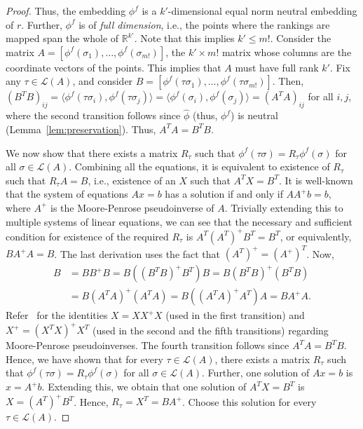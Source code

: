 \documentclass[prodmode,acmec]{ec-acmsmall}
\newcommand{\calL}{{\mathcal{L}}}
\newcommand{\rank}{{\calL(A)}}
\begin{document}
\begin{proof}
Thus, the embedding $\phi^f$ is a $k'$-dimensional equal norm neutral embedding of $r$. Further, $\phi^f$ is of \emph{full dimension}, i.e., the points where the rankings are mapped span the whole of $\mathbb{R}^{k'}$. Note that this implies $k' \le m!$. Consider the matrix $A = [\phi^f(\sigma_1), \ldots, \phi^f(\sigma_{m!})]$, the $k' \times m!$ matrix whose columns are the coordinate vectors of the points. This implies that $A$ must have full rank $k'$. Fix any $\tau \in \rank$, and consider $B = [\phi^f(\tau \sigma_1), \ldots, \phi^f(\tau \sigma_{m!})]$. Then, $(B^T B)_{ij} = \langle \phi^f(\tau \sigma_i), \phi^f(\tau \sigma_j) \rangle = \langle \phi^f(\sigma_i), \phi^f(\sigma_j) \rangle = (A^T A)_{ij}$ for all $i,j$, where the second transition follows since $\hat{\phi}$ (thus, $\phi^f$) is neutral (Lemma~\ref{lem:preservation}). Thus, $A^T A = B^T B$.

We now show that there exists a matrix $R_{\tau}$ such that $\phi^f(\tau \sigma) = R_{\tau} \phi^f(\sigma)$ for all $\sigma \in \rank$. Combining all the equations, it is equivalent to existence of $R_{\tau}$ such that $R_{\tau} A = B$, i.e., existence of an $X$ such that $A^T X = B^T$. It is well-known that the system of equations $Ax=b$ has a solution if and only if $AA^{+}b = b$, where $A^{+}$ is the Moore-Penrose pseudoinverse of $A$. Trivially extending this to multiple systems of linear equations, we can see that the necessary and sufficient condition for existence of the required $R_{\tau}$ is $A^T (A^T)^{+} B^T = B^T$, or equivalently, $B A^{+} A = B$. The last derivation uses the fact that $(A^T)^{+} = (A^{+})^T$. Now, 
\begin{align*}
B &= B B^{+} B = B \left( (B^T B)^{+} B^T \right) B = B (B^T B)^{+} \left( B^T B \right) \\
&= B (A^T A)^{+} \left( A^T A \right) = B \left( (A^T A)^{+} A^T \right) A = B A^{+} A.
\end{align*}
Refer~\cite{BH12} for the identities $X = X X^{+} X$ (used in the first transition) and $X^{+} = (X^T X)^{+} X^T$ (used in the second and the fifth transitions) regarding Moore-Penrose pseudoinverses. The fourth transition follows since $A^T A = B^T B$. Hence, we have shown that for every $\tau \in \rank$, there exists a matrix $R_{\tau}$ such that $\phi^f(\tau \sigma) = R_{\tau} \phi^f(\sigma)$ for all $\sigma \in \rank$. Further, one solution of $Ax=b$ is $x = A^{+}b$. Extending this, we obtain that one solution of $A^T X = B^T$ is $X = (A^T)^{+} B^T$. Hence, $R_{\tau} = X^T = BA^{+}$. Choose this solution for every $\tau \in \rank$. 


\end{proof}
\end{document}
